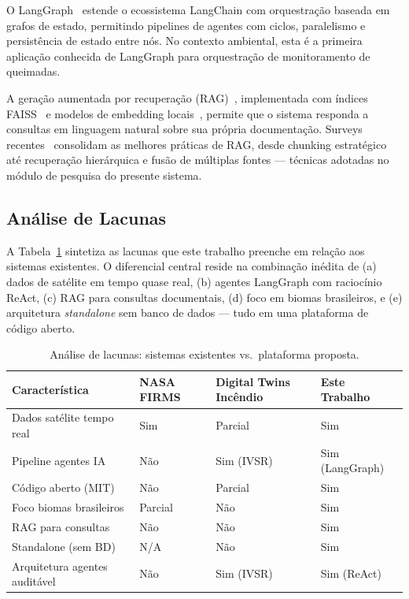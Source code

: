 \documentclass[preprint,times,numbers]{elsarticle}
\begin{document}
O LangGraph~\cite{manual:langgraph2024} estende o ecossistema LangChain com orquestração baseada em grafos de estado, permitindo pipelines de agentes com ciclos, paralelismo e persistência de estado entre nós. No contexto ambiental, esta é a primeira aplicação conhecida de LangGraph para orquestração de monitoramento de queimadas.

A geração aumentada por recuperação (RAG)~\cite{article:lewis2020}, implementada com índices FAISS~\cite{article:faiss2017} e modelos de embedding locais~\cite{model:bge2024}, permite que o sistema responda a consultas em linguagem natural sobre sua própria documentação. Surveys recentes~\cite{article:gao2024rag} consolidam as melhores práticas de RAG, desde chunking estratégico até recuperação hierárquica e fusão de múltiplas fontes --- técnicas adotadas no módulo de pesquisa do presente sistema.

\subsection{Análise de Lacunas}

A Tabela~\ref{tab:gap-analysis} sintetiza as lacunas que este trabalho preenche em relação aos sistemas existentes. O diferencial central reside na combinação inédita de (a) dados de satélite em tempo quase real, (b) agentes LangGraph com raciocínio ReAct, (c) RAG para consultas documentais, (d) foco em biomas brasileiros, e (e) arquitetura \emph{standalone} sem banco de dados --- tudo em uma plataforma de código aberto.

\begin{table}[htbp]
\centering
\caption{Análise de lacunas: sistemas existentes vs.\ plataforma proposta.}
\label{tab:gap-analysis}
\small
\begin{tabular}{lp{2.5cm}p{2cm}p{2cm}}
\toprule
\textbf{Característica} & \textbf{NASA FIRMS} & \textbf{Digital Twins Incêndio} & \textbf{Este Trabalho} \\
\midrule
Dados satélite tempo real & Sim & Parcial & Sim \\
Pipeline agentes IA & Não & Sim (IVSR) & Sim (LangGraph) \\
Código aberto (MIT) & Não & Parcial & Sim \\
Foco biomas brasileiros & Parcial & Não & Sim \\
RAG para consultas & Não & Não & Sim \\
Standalone (sem BD) & N/A & Não & Sim \\
Arquitetura agentes auditável & Não & Sim (IVSR) & Sim (ReAct) \\
\bottomrule
\end{tabular}
\end{table}
\end{document}
